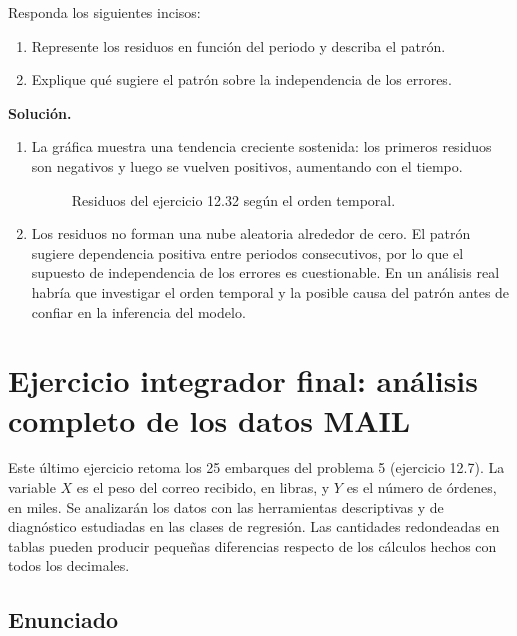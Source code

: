 Responda los siguientes incisos:
\begin{enumerate}
    \item[\textbf{a)}] Represente los residuos en función del periodo y describa el patrón.
    \item[\textbf{b)}] Explique qué sugiere el patrón sobre la independencia de los errores.
\end{enumerate}

\textbf{Solución.}
\begin{enumerate}
    \item[\textbf{a)}] La gráfica muestra una tendencia creciente sostenida: los primeros residuos son negativos y luego se vuelven positivos, aumentando con el tiempo.
    \begin{figure}[H]
    \centering
    
    \caption{Residuos del ejercicio 12.32 según el orden temporal.}
    \label{fig:clase4-residuos-tiempo}
    \end{figure}
    \item[\textbf{b)}] Los residuos no forman una nube aleatoria alrededor de cero. El patrón sugiere dependencia positiva entre periodos consecutivos, por lo que el supuesto de independencia de los errores es cuestionable. En un análisis real habría que investigar el orden temporal y la posible causa del patrón antes de confiar en la inferencia del modelo.
\end{enumerate}

\clearpage
\section{Ejercicio integrador final: análisis completo de los datos MAIL}

Este último ejercicio retoma los 25 embarques del problema 5 (ejercicio 12.7). La variable $X$ es el peso del correo recibido, en libras, y $Y$ es el número de órdenes, en miles. Se analizarán los datos con las herramientas descriptivas y de diagnóstico estudiadas en las clases de regresión. Las cantidades redondeadas en tablas pueden producir pequeñas diferencias respecto de los cálculos hechos con todos los decimales.

\subsection*{Enunciado}

